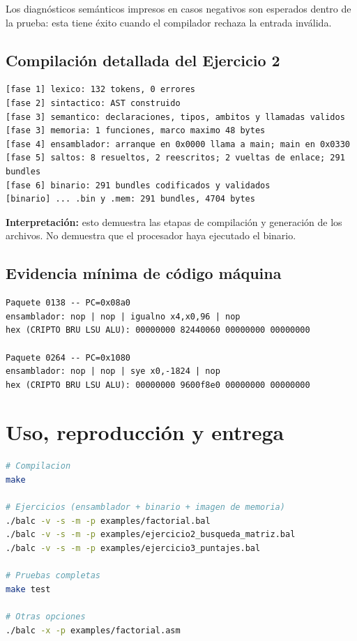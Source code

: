 Los diagnósticos semánticos impresos en casos negativos son
esperados dentro de la prueba: esta tiene éxito cuando el
compilador rechaza la entrada inválida.

\subsection{Compilación detallada del Ejercicio
2}\label{102-compilaciuxf3n-detallada-del-ejercicio-2}

\begin{lstlisting}
[fase 1] lexico: 132 tokens, 0 errores
[fase 2] sintactico: AST construido
[fase 3] semantico: declaraciones, tipos, ambitos y llamadas validos
[fase 3] memoria: 1 funciones, marco maximo 48 bytes
[fase 4] ensamblador: arranque en 0x0000 llama a main; main en 0x0330
[fase 5] saltos: 8 resueltos, 2 reescritos; 2 vueltas de enlace; 291 bundles
[fase 6] binario: 291 bundles codificados y validados
[binario] ... .bin y .mem: 291 bundles, 4704 bytes
\end{lstlisting}

\textbf{Interpretación:} esto demuestra las etapas de compilación y
generación de los archivos. No demuestra que el procesador haya
ejecutado el binario.

\subsection{Evidencia mínima de código
máquina}\label{103-evidencia-muxednima-de-cuxf3digo-muxe1quina}

\begin{lstlisting}
Paquete 0138 -- PC=0x08a0
ensamblador: nop | nop | igualno x4,x0,96 | nop
hex (CRIPTO BRU LSU ALU): 00000000 82440060 00000000 00000000

Paquete 0264 -- PC=0x1080
ensamblador: nop | nop | sye x0,-1824 | nop
hex (CRIPTO BRU LSU ALU): 00000000 9600f8e0 00000000 00000000
\end{lstlisting}

\section{Uso, reproducción y
entrega}\label{12-uso-reproducciuxf3n-y-entrega}

\begin{lstlisting}[language=bash]
# Compilacion
make

# Ejercicios (ensamblador + binario + imagen de memoria)
./balc -v -s -m -p examples/factorial.bal
./balc -v -s -m -p examples/ejercicio2_busqueda_matriz.bal
./balc -v -s -m -p examples/ejercicio3_puntajes.bal

# Pruebas completas
make test

# Otras opciones
./balc -x -p examples/factorial.asm
\end{lstlisting}

